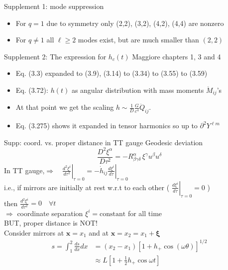 \documentclass[xcolor=dvipsnames,handout,t]{beamer}
\renewcommand{\t}{\theta}
\begin{document}
\begin{frame}{Supplement 1: mode suppression}
\begin{itemize}
 \item For $q=1$ due to symmetry only (2,2), (3,2), (4,2), (4,4) are nonzero 
 \item For $q\ne 1$ all $\ell \ge 2$ modes exist, but are much smaller than $(2,2)$
\end{itemize}
\end{frame}


\begin{frame}{Supplement 2: The expression for $h_c(t)$}
Maggiore chapters 1, 3 and 4
\begin{itemize}
 \item Eq. (3.3) expanded to (3.9), (3.14) to (3.34) to (3.55) to (3.59)
 \item Eq. (3.72): $h(t)$ as angular distribution with mass moments $\ddot{M}_{ij}$'s
 \item At that point we get the scaling $h \sim \tfrac{1}{D}\tfrac{G}{c^4}\ddot{Q}_{ij}$.
 \item Eq. (3.275) shows it expanded in tensor harmonics so up to $\partial^2 Y^{\ell m}$
\end{itemize}
\end{frame}

\begin{frame}{Supp: coord. vs. proper distance in TT gauge}
  Geodesic deviation 
  \[
   \frac{D^2 \xi^\alpha}{D\tau^2} = -R^\alpha_{\beta \gamma\delta}\, \xi^\gamma u^\beta u^\delta 
  \]
In TT gauge,\qquad  $\Longrightarrow \quad\left.\tfrac{d^2 \xi^i}{d\tau^2}\right|_{\tau=0} = -\left. \dot{h}_{ij} \tfrac{d\xi^i}{d\tau}\right|_{\tau=0}$\\
i.e., if mirrors are initially at rest w.r.t to each other ( $\left. \tfrac{d\xi^i}{d\tau}\right|_{\tau=0} =0$ )\\
then $\tfrac{d^2 \xi^i}{d\tau^2}=0\quad \forall t$ \\
$\Longrightarrow$ coordinate separation $\xi^i = \text{constant}$ for all time \\
BUT, proper distance is NOT! \\
Consider mirrors at $\mathbf{x}=x_1$ and at $\mathbf{x}=x_2=x_1+\mathbf{\xi}$
\begin{align*}
  s = \int_1^2 \tfrac{ds}{dx}dx &= (x_2-x_1) \left[ 1 + h_+ \cos(\omega\t)\right]^{1/2} \\
			      & \approx L \left[ 1+\tfrac{1}{2} h_+ \cos\omega t \right] 
\end{align*}
 \end{frame}
\end{document}
